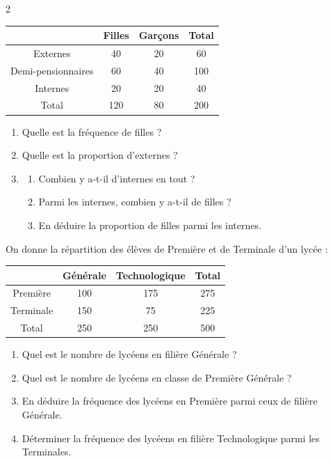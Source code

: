 \documentclass[a4paper,11pt]{article}
\begin{document}
\begin{multicols}{2}
\begin{exercice}[title=Exercice 5 $\star$ { [Calculer] }]{}{}
  \begin{center}
  \small
  \renewcommand{\arraystretch}{1.2}
  \begin{tabular}{|c|c|c|c|}
  \hline
   & Filles & Garçons & Total \\ \hline
  Externes & 40 & 20 & 60 \\ \hline
  Demi-pensionnaires & 60 & 40 & 100 \\ \hline
  Internes & 20 & 20 & 40 \\ \hline
  Total & 120 & 80 & 200 \\ \hline
  \end{tabular}
  \end{center}
  
  \begin{enumerate}[noitemsep]
    \item Quelle est la fréquence de filles ?
    \item Quelle est la proportion d'externes ?
    \item 
      \begin{enumerate}[noitemsep]
        \item[(a)] Combien y a-t-il d'internes en tout ?
        \item[(b)] Parmi les internes, combien y a-t-il de filles ?
        \item[(c)] En déduire la proportion de filles parmi les internes.
      \end{enumerate}
  \end{enumerate}
\end{exercice}

\null\vfill

\begin{exercice}[title=Exercice 6 $\star$ { [Calculer] }]{}{}
  On donne la répartition des élèves de Première et de Terminale d'un lycée :
  
  \begin{center}
  \small
  \renewcommand{\arraystretch}{1.2}
  \begin{tabular}{|c|c|c|c|}
  \hline
   & Générale & Technologique & Total \\ \hline
  Première & 100 & 175 & 275 \\ \hline
  Terminale & 150 & 75 & 225 \\ \hline
  Total & 250 & 250 & 500 \\ \hline
  \end{tabular}
  \end{center}
  
  \begin{enumerate}
    \item Quel est le nombre de lycéens en filière Générale ?
    \item Quel est le nombre de lycéens en classe de Première Générale ?
    \item En déduire la fréquence des lycéens en Première parmi ceux de filière Générale.
    \item Déterminer la fréquence des lycéens en filière Technologique parmi les Terminales.
  \end{enumerate}
\end{exercice}


\end{multicols}
\end{document}
